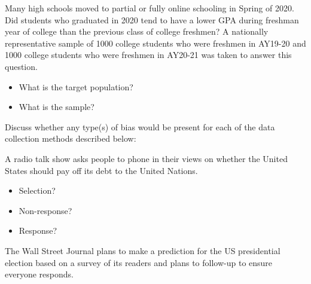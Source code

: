 \documentclass[
]{report}
\providecommand{\tightlist}{%
  \setlength{\itemsep}{0pt}\setlength{\parskip}{0pt}}
\begin{document}
Many high schools moved to partial or fully online schooling in Spring of 2020. Did students who graduated in 2020 tend to have a lower GPA during freshman year of college than the previous class of college freshmen? A nationally representative sample of 1000 college students who were freshmen in AY19-20 and 1000 college students who were freshmen in AY20-21 was taken to answer this question.

\begin{itemize}
\tightlist
\item
  What is the target population?
\end{itemize}

\vspace{0.2in}

\begin{itemize}
\tightlist
\item
  What is the sample?
\end{itemize}

\vspace{0.2in}

\newpage

Discuss whether any type(s) of bias would be present for each of the data collection methods described below:

A radio talk show asks people to phone in their views on whether the United States should pay off its debt to the United Nations.

\begin{itemize}
\tightlist
\item
  Selection?
\end{itemize}

\vspace{0.25in}

\begin{itemize}
\tightlist
\item
  Non-response?
\end{itemize}

\vspace{0.25in}

\begin{itemize}
\tightlist
\item
  Response?
\end{itemize}

\vspace{0.25in}

The Wall Street Journal plans to make a prediction for the US presidential election based on a survey of its readers and plans to follow-up to ensure everyone responds.
\end{document}

